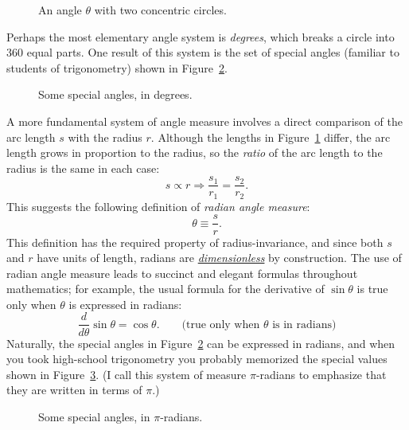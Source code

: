 \begin{figure}
\begin{center}
\end{center}
\caption{An angle $\theta$ with two concentric circles.\label{fig:angle_arclength}}
\end{figure}

Perhaps the most elementary angle system is \emph{degrees}, which breaks a circle into 360 equal parts. One result of this system is the set of special angles (familiar to students of trigonometry) shown in Figure~\ref{fig:degree_angles}.

\begin{figure}
\begin{center}
\end{center}
\caption{Some special angles, in degrees.\label{fig:degree_angles}}
\end{figure}

A more fundamental system of angle measure involves a direct comparison of the arc length $s$ with the radius $r$. Although the lengths in Figure~\ref{fig:angle_arclength} differ, the arc length grows in proportion to the radius, so the \emph{ratio} of the arc length to the radius is the same in each case:
\[
s\propto r \Rightarrow \frac{s_1}{r_1} = \frac{s_2}{r_2}.
\]
This suggests the following definition of \emph{radian angle measure}:
\begin{equation}
\label{eq:radians}
\theta \equiv \frac{s}{r}.
\end{equation}
This definition has the required property of radius-invariance, and since both $s$ and $r$ have units of length, radians are \href{https://en.wikipedia.org/wiki/Dimensionless_quantity}{\emph{dimensionless}} by construction. The use of radian angle measure leads to succinct and elegant formulas throughout mathematics; for example, the usual formula for the derivative of $\sin\theta$ is true only when $\theta$ is expressed in radians:
\[
  \frac{d}{d\theta}\sin\theta = \cos\theta. \qquad\mbox{(true only when $\theta$ is in radians)}
\]
Naturally, the special angles in Figure~\ref{fig:degree_angles} can be expressed in radians, and when you took high-school trigonometry you probably memorized the special values shown in Figure~\ref{fig:pi_angles}. (I call this system of measure $\pi$-radians to emphasize that they are written in terms of $\pi$.)

\begin{figure}
\begin{center}
\end{center}
\caption{Some special angles, in $\pi$-radians.\label{fig:pi_angles}}
\end{figure}


